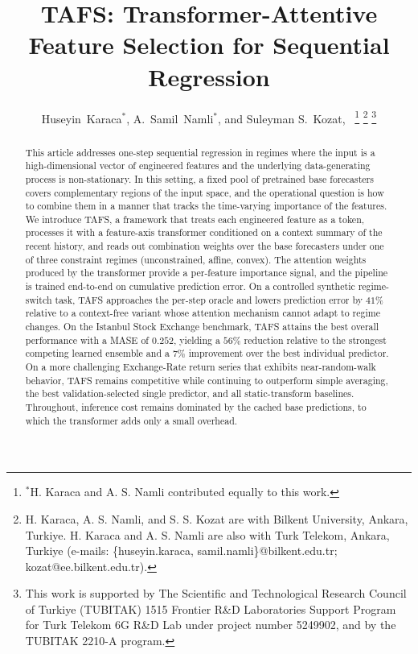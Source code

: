 \documentclass[journal]{IEEEtran}
\begin{document}
\title{TAFS: Transformer-Attentive Feature Selection for Sequential Regression}
\author{Huseyin~Karaca$^{*}$,
        A.~Samil~Namli$^{*}$, 
        and Suleyman S.~Kozat,~
\thanks{$^{*}$H. Karaca and A. S. Namli contributed equally to this work.}
\thanks{H. Karaca, A. S. Namli, and S. S. Kozat are with Bilkent University, Ankara, Turkiye. H. Karaca and A. S. Namli are also with Turk Telekom, Ankara, Turkiye (e-mails: \{huseyin.karaca, samil.namli\}@bilkent.edu.tr; kozat@ee.bilkent.edu.tr).}%
\thanks{This work is supported by The Scientific and Technological Research Council of Turkiye (TUBITAK) 1515 Frontier R\&D Laboratories Support Program for Turk Telekom 6G R\&D Lab under project number 5249902, and by the TUBITAK 2210-A program.}%
}

\maketitle

\begin{abstract}
This article addresses one-step sequential regression in regimes where the input is a high-dimensional vector of engineered features and the underlying data-generating process is non-stationary. In this setting, a fixed pool of pretrained base forecasters covers complementary regions of the input space, and the operational question is how to combine them in a manner that tracks the time-varying importance of the features. We introduce TAFS, a framework that treats each engineered feature as a token, processes it with a feature-axis transformer conditioned on a context summary of the recent history, and reads out combination weights over the base forecasters under one of three constraint regimes (unconstrained, affine, convex). The attention weights produced by the transformer provide a per-feature importance signal, and the pipeline is trained end-to-end on cumulative prediction error. On a controlled synthetic regime-switch task, TAFS approaches the per-step oracle and lowers prediction error by $41\%$ relative to a context-free variant whose attention mechanism cannot adapt to regime changes. On the Istanbul Stock Exchange benchmark, TAFS attains the best overall performance with a MASE of $0.252$, yielding a $56\%$ reduction relative to the strongest competing learned ensemble and a $7\%$ improvement over the best individual predictor. On a more challenging Exchange-Rate return series that exhibits near-random-walk behavior, TAFS remains competitive while continuing to outperform simple averaging, the best validation-selected single predictor, and all static-transform baselines. Throughout, inference cost remains dominated by the cached base predictions, to which the transformer adds only a small overhead.
\end{abstract}
\end{document}

